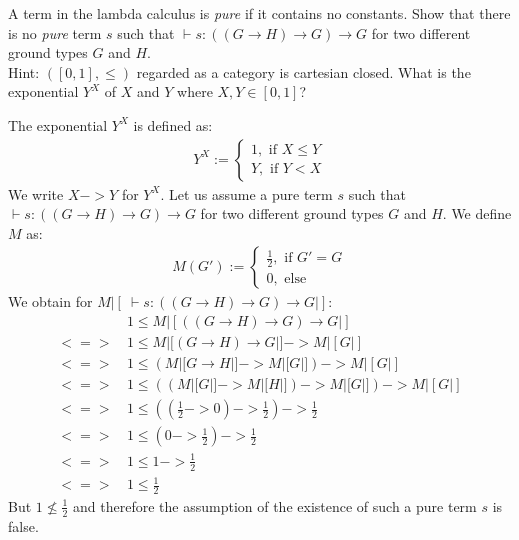 \begin{exercise}
    \label{ex:pure-peirce}
    A term in the lambda calculus is \textit{pure} if it contains no constants.
    Show that there is no \textit{pure} term $s$ such that $ \vdash s: ((G \to H) \to G) \to G$ for two different ground types $G$ and $H$.\\
    Hint: $([0, 1], \le)$ regarded as a category is cartesian closed.
    What is the exponential $Y^X$ of $X$ and $Y$ where $X, Y \in [0, 1]$?
\end{exercise}
\begin{answer}
    The exponential $Y^X$ is defined as:
    \begin{align*}
        Y^X := \begin{cases}
            1, \text{ if } X \le Y\\
            Y, \text{ if } Y < X
               \end{cases}
    \end{align*}
    We write $X -> Y$ for $Y^X$.
    Let us assume a pure term $s$ such that $ \vdash s: ((G \to H) \to G) \to G$ for two different ground types $G$ and $H$.
    We define $M$ as:
    \begin{align*}
        M(G') := \begin{cases}
                \frac{1}{2}, \text{ if } G' = G\\
                0, \text{ else}
            \end{cases}
    \end{align*}
    We obtain for $M|[\ \vdash s: ((G \to H) \to G) \to G|]$:
    \begin{align*}
            & 1 \le M|[((G \to H) \to G) \to G|] \\
        <=>\, & 1 \le M|[(G \to H) \to G|] -> M|[G|] \\
        <=>\, & 1 \le (M|[G \to H|] -> M|[G|]) -> M|[G|] \\
        <=>\, & 1 \le ((M|[G|] -> M|[H|]) -> M|[G|]) -> M|[G|] \\
        <=>\, & 1 \le ((\frac{1}{2} -> 0) -> \frac{1}{2}) -> \frac{1}{2} \\
        <=>\, & 1 \le (0 -> \frac{1}{2}) -> \frac{1}{2} \\
        <=>\, & 1 \le 1 -> \frac{1}{2} \\
        <=>\, & 1 \le \frac{1}{2}
    \end{align*}
    But $1 \nleq \frac{1}{2}$ and therefore the assumption of the existence of such a pure term $s$ is false.
\end{answer}

